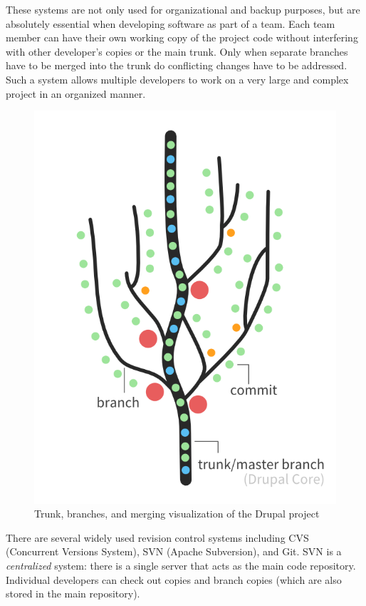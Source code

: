 \documentclass[12pt]{scrartcl}
\begin{document}
These systems are not only used for organizational and backup 
purposes, but are absolutely essential when developing software 
as part of a team.  Each team member can have their own working 
copy of the project code without interfering with other developer's 
copies or the main trunk.  Only when separate branches have to 
be merged into the trunk do conflicting changes have to be addressed.  
Such a system allows multiple developers to work on a 
very large and complex project in an organized manner.

\begin{figure}[h]
\centering
\includegraphics[scale=.5]{./hack1.0-files/repositorydiagram}
\caption{Trunk, branches, and merging visualization of the Drupal project}
\end{figure}

There are several widely used revision control systems including 
CVS (Concurrent Versions System), SVN (Apache Subversion), and 
Git.  SVN is a \emph{centralized} system: there is a single server that 
acts as the main code repository.  Individual developers can check out 
copies and branch copies (which are also stored in the main repository).  
\end{document}
